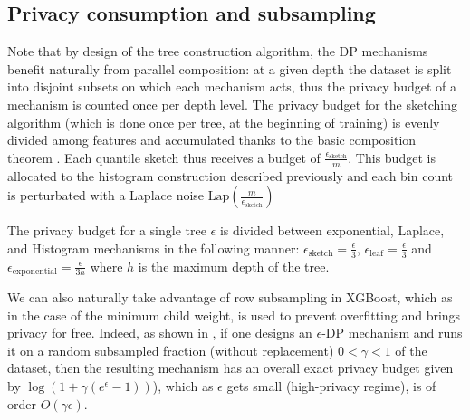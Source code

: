 \documentclass{article}
\theoremstyle{definition}
\begin{document}
\subsection{Privacy consumption and subsampling} 

Note that by design of the tree construction algorithm, the DP mechanisms benefit naturally from parallel composition:
at a given depth the dataset is split into disjoint subsets on which each mechanism acts, thus the privacy budget of a mechanism is counted once per depth level.
The privacy budget for the sketching algorithm (which is done once per tree, at the beginning of training)
is evenly divided among features and accumulated thanks to the basic composition theorem \cite{dwork2014, kairouz2015composition}.
Each quantile sketch thus receives a budget of $ \frac{ \epsilon_{\text{sketch}} }{m}$.
This budget is allocated to the histogram construction described previously and each bin count is perturbated with a Laplace noise $\text{Lap}\left( \frac{m}{\epsilon_{\text{sketch}}}\right)$

The privacy budget for a single tree $\epsilon$ is divided between exponential,
Laplace, and Histogram mechanisms in the following manner:
$\epsilon_{\text{sketch}} = \frac{\epsilon}{3}$, $\epsilon_{\text{leaf}} = \frac{\epsilon}{3}$
and $\epsilon_{\text{exponential}} = \frac{\epsilon}{3 h}$ where $h$ is the maximum depth of the tree.

We can also naturally take advantage of row subsampling in XGBoost, which as in the case of the minimum child weight,
is used to prevent overfitting and brings privacy for free. Indeed, as shown in \cite{balle2018subsampling},
if one designs an $\epsilon$-DP mechanism and runs it on a random subsampled fraction (without replacement) $0 < \gamma < 1$ of the dataset,
then the resulting mechanism has an overall exact privacy budget given by $\log\left(1 + \gamma(e^{\epsilon} - 1)\right)$), which as $\epsilon$ gets small (high-privacy regime), is of order $O(\gamma \epsilon)$. 
\end{document}
